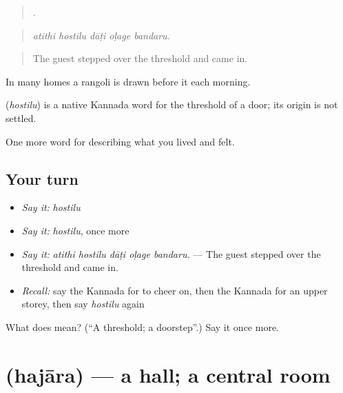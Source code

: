 \begin{quote}
    .
\end{quote}

\begin{quote}
\emph{atithi hostilu dāṭi oḷage bandaru.}
\end{quote}

\begin{quote}
The guest stepped over the threshold and came in.
\end{quote}

In many homes a rangoli is drawn before it each morning.

\begin{cousinweb}
\textbf{} (\emph{hostilu}) is a native Kannada word for the threshold of a door; its origin is not settled.
\end{cousinweb}

\begin{grammarlens}[title={What you've built}]
One more word for describing what you lived and felt.
\end{grammarlens}

\subsection*{Your turn}
\begin{itemize}
\raggedright
  \item \emph{Say it:} \emph{hostilu}
  \item \emph{Say it:} \emph{hostilu}, once more
  \item \emph{Say it:} \emph{atithi hostilu dāṭi oḷage bandaru.} — The guest stepped over the threshold and came in.
  \item \emph{Recall:} say the Kannada for to cheer on, then the Kannada for an upper storey, then say \emph{hostilu} again
\end{itemize}

\begin{tcolorbox}[breakable,colback=teal!4,colframe=teal!35!black,title={Before you move on}]
What does  mean? (\textquotedblleft{}A threshold; a doorstep\textquotedblright{}.) Say it once more.
\end{tcolorbox}
\section[\texorpdfstring{\kn{ಹಜಾರ} (hajāra)}{ಹಜಾರ (hajāra)}]{ (hajāra) — a hall; a central room}

